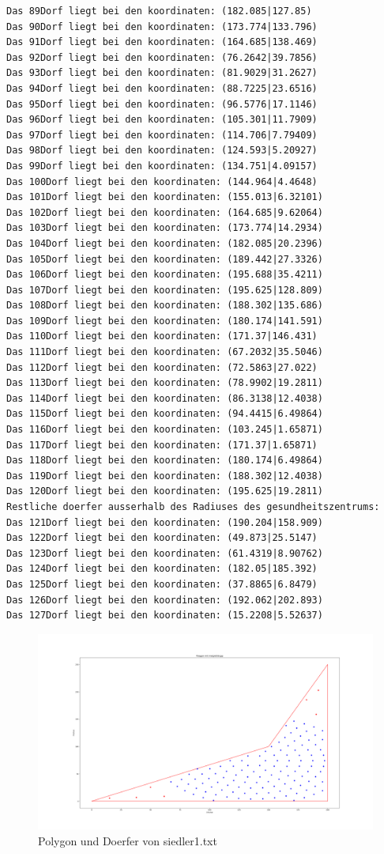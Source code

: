\documentclass{article}
\begin{document}
\begin{verbatim}
Das 89Dorf liegt bei den koordinaten: (182.085|127.85)
Das 90Dorf liegt bei den koordinaten: (173.774|133.796)
Das 91Dorf liegt bei den koordinaten: (164.685|138.469)
Das 92Dorf liegt bei den koordinaten: (76.2642|39.7856)
Das 93Dorf liegt bei den koordinaten: (81.9029|31.2627)
Das 94Dorf liegt bei den koordinaten: (88.7225|23.6516)
Das 95Dorf liegt bei den koordinaten: (96.5776|17.1146)
Das 96Dorf liegt bei den koordinaten: (105.301|11.7909)
Das 97Dorf liegt bei den koordinaten: (114.706|7.79409)
Das 98Dorf liegt bei den koordinaten: (124.593|5.20927)
Das 99Dorf liegt bei den koordinaten: (134.751|4.09157)
Das 100Dorf liegt bei den koordinaten: (144.964|4.4648)
Das 101Dorf liegt bei den koordinaten: (155.013|6.32101)
Das 102Dorf liegt bei den koordinaten: (164.685|9.62064)
Das 103Dorf liegt bei den koordinaten: (173.774|14.2934)
Das 104Dorf liegt bei den koordinaten: (182.085|20.2396)
Das 105Dorf liegt bei den koordinaten: (189.442|27.3326)
Das 106Dorf liegt bei den koordinaten: (195.688|35.4211)
Das 107Dorf liegt bei den koordinaten: (195.625|128.809)
Das 108Dorf liegt bei den koordinaten: (188.302|135.686)
Das 109Dorf liegt bei den koordinaten: (180.174|141.591)
Das 110Dorf liegt bei den koordinaten: (171.37|146.431)
Das 111Dorf liegt bei den koordinaten: (67.2032|35.5046)
Das 112Dorf liegt bei den koordinaten: (72.5863|27.022)
Das 113Dorf liegt bei den koordinaten: (78.9902|19.2811)
Das 114Dorf liegt bei den koordinaten: (86.3138|12.4038)
Das 115Dorf liegt bei den koordinaten: (94.4415|6.49864)
Das 116Dorf liegt bei den koordinaten: (103.245|1.65871)
Das 117Dorf liegt bei den koordinaten: (171.37|1.65871)
Das 118Dorf liegt bei den koordinaten: (180.174|6.49864)
Das 119Dorf liegt bei den koordinaten: (188.302|12.4038)
Das 120Dorf liegt bei den koordinaten: (195.625|19.2811)
Restliche doerfer ausserhalb des Radiuses des gesundheitszentrums: 
Das 121Dorf liegt bei den koordinaten: (190.204|158.909)
Das 122Dorf liegt bei den koordinaten: (49.873|25.5147)
Das 123Dorf liegt bei den koordinaten: (61.4319|8.90762)
Das 124Dorf liegt bei den koordinaten: (182.05|185.392)
Das 125Dorf liegt bei den koordinaten: (37.8865|6.8479)
Das 126Dorf liegt bei den koordinaten: (192.062|202.893)
Das 127Dorf liegt bei den koordinaten: (15.2208|5.52637)
\end{verbatim}
\newpage
\begin{figure}[h]
    \centering
    \includegraphics[width=1\textwidth]{Bilder/Figure_1.png}
    \caption{Polygon und Doerfer von siedler1.txt}
    \label{fig:example}
\end{figure}
\end{document}
